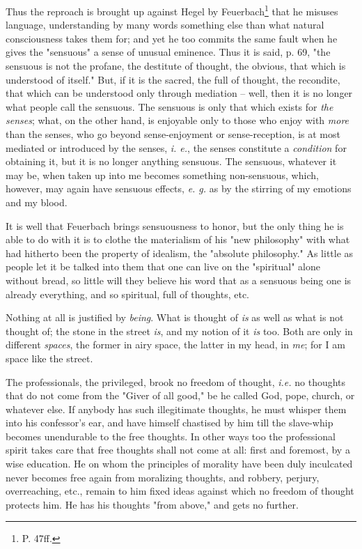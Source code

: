 \documentclass[a4paper]{book}
\begin{document}
Thus the reproach is brought up against Hegel by Feuerbach\footnote{P. 47ff.} 
that he misuses language, understanding by many words something else than what 
natural consciousness takes them for; and yet he too commits the same fault 
when he gives the "{}sensuous"{} a sense of unusual eminence. Thus it is said, 
p. 69, "{}the sensuous is not the profane, the destitute of thought, the 
obvious, that which is understood of itself."{} But, if it is the sacred, the 
full of thought, the recondite, that which can be understood only through 
mediation -- well, then it is no longer what people call the sensuous. The 
sensuous is only that which exists for \textit{the senses}; what, on the other 
hand, is enjoyable only to those who enjoy with \textit{more} than the senses, 
who go beyond sense-enjoyment or sense-reception, is at most mediated or 
introduced by the senses, \textit{i. e.}, the senses constitute a 
\textit{condition} for obtaining it, but it is no longer anything sensuous. 
The sensuous, whatever it may be, when taken up into me becomes something 
non-sensuous, which, however, may again have sensuous effects, \textit{e. g.} 
as by the stirring of my emotions and my blood.

It is well that Feuerbach brings sensuousness to honor, but the only thing he 
is able to do with it is to clothe the materialism of his "{}new philosophy"{} 
with what had hitherto been the property of idealism, the "{}absolute 
philosophy."{} As little as people let it be talked into them that one can 
live on the "{}spiritual"{} alone without bread, so little will they believe 
his word that as a sensuous being one is already everything, and so spiritual, 
full of thoughts, etc.

Nothing at all is justified by \textit{being}. What is thought of \textit{is} 
as well as what is not thought of; the stone in the street \textit{is}, and my 
notion of it \textit{is} too. Both are only in different \textit{spaces}, the 
former in airy space, the latter in my head, in \textit{me}; for I am space 
like the street.

The professionals, the privileged, brook no freedom of thought, \textit{i.e.} 
no thoughts that do not come from the "{}Giver of all good,"{} be he called 
God, pope, church, or whatever else. If anybody has such illegitimate 
thoughts, he must whisper them into his confessor's ear, and have himself 
chastised by him till the slave-whip becomes unendurable to the free thoughts. 
In other ways too the professional spirit takes care that free thoughts shall 
not come at all: first and foremost, by a wise education. He on whom the 
principles of morality have been duly inculcated never becomes free again from 
moralizing thoughts, and robbery, perjury, overreaching, etc., remain to him 
fixed ideas against which no freedom of thought protects him. He has his 
thoughts "{}from above,"{} and gets no further.
\end{document}
